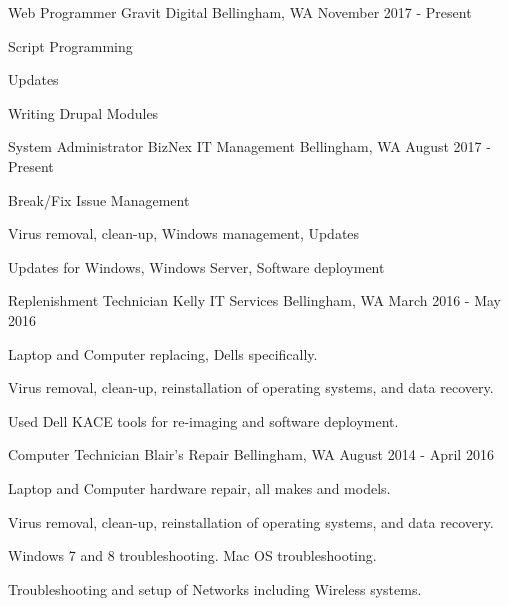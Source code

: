\begin{cventries}
 
  \cventry
    {Web Programmer}
    {Gravit Digital}
    {Bellingham, WA}
    {November 2017 - Present}
    {
      \begin{cvitems}
      \item {Script Programming}
      \item {Updates}
      \item {Writing Drupal Modules}
      \end{cvitems}
    }

  \cventry
    {System Administrator}
    {BizNex IT Management}
    {Bellingham, WA}
    {August 2017 - Present}
    {
      \begin{cvitems}
      \item {Break/Fix Issue Management}
      \item {Virus removal, clean-up, Windows management, Updates}
      \item {Updates for Windows, Windows Server, Software deployment}
      \end{cvitems}
    }

  \cventry
    {Replenishment Technician}
    {Kelly IT Services}
    {Bellingham, WA}
    {March 2016 - May 2016}
    {
      \begin{cvitems}
        \item {Laptop and Computer replacing, Dells specifically.}
        \item {Virus removal, clean-up, reinstallation of operating systems, and data recovery.}
        \item {Used Dell KACE tools for re-imaging and software deployment.}
      \end{cvitems}
    }

  \cventry
    {Computer Technician}
    {Blair’s Repair}
    {Bellingham, WA}
    {August 2014 - April 2016}
    {
      \begin{cvitems}
        \item {Laptop and Computer hardware repair, all makes and models.}
        \item {Virus removal, clean-up, reinstallation of operating systems, and data recovery.}
        \item {Windows 7 and 8 troubleshooting.  Mac OS troubleshooting.}
        \item {Troubleshooting and setup of Networks including Wireless systems.}
      \end{cvitems}
    }


\end{cventries}
